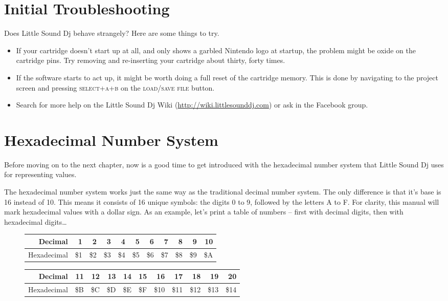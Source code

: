 \section{Initial Troubleshooting}

Does Little Sound Dj behave strangely? Here are some things to try.

\begin{itemize}
\item If your cartridge doesn't start up at all, and only shows a garbled Nintendo logo at startup, the problem might be oxide on the cartridge pins. Try removing and re-inserting your cartridge about thirty, forty times.
\item If the software starts to act up, it might be worth doing a full reset of the cartridge memory. This is done by navigating to the project screen and pressing \textsc{select+a+b} on the \textsc{load/save file} button.
\item Search for more help on the Little Sound Dj Wiki (\url{http://wiki.littlesounddj.com}) or ask in the Facebook group.
\end{itemize}

\section{Hexadecimal Number System}

Before moving on to the next chapter, now is a good time to get introduced with the hexadecimal number system that Little Sound Dj uses for representing values.

The hexadecimal number system works just the same way as the traditional decimal number system. The only difference is that it's base is 16 instead of 10. This means it consists of 16 unique symbols: the digits 0 to 9, followed by the letters A to F. For clarity, this manual will mark hexadecimal values with a dollar sign.
As an example, let's print a table of numbers -- first with decimal digits, then with
hexadecimal digits\ldots

\begin{figure}[hbtp]
\centering

\begin{tabular}{r|r|r|r|r|r|r|r|r|r|r}
 Decimal & 1 & 2 & 3 & 4 & 5 & 6 & 7 & 8 & 9 & 10 \\
\hline
 Hexadecimal & \$1 & \$2 & \$3 & \$4 & \$5 & \$6 & \$7 & \$8 & \$9 & \$A \\
\end{tabular}

\begin{tabular}{r|r|r|r|r|r|r|r|r|r|r}
 Decimal & 11 & 12 & 13 & 14 & 15 & 16 & 17 & 18 & 19 & 20 \\
\hline
 Hexadecimal & \$B & \$C & \$D & \$E & \$F & \$10 & \$11 & \$12 & \$13 & \$14  \\
\end{tabular}

\end{figure}

